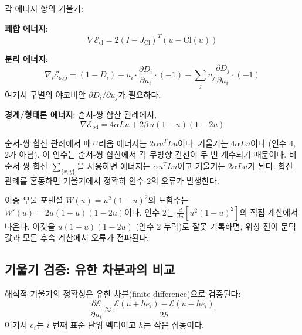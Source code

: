 각 에너지 항의 기울기:

\textbf{폐합 에너지}:
\begin{equation}
    \nabla \mathcal{E}_{\mathrm{cl}} = 2(I - J_{\mathrm{Cl}})^T (u - \mathrm{Cl}(u))
    \label{eq:grad-ecl}
\end{equation}

\textbf{분리 에너지}:
\begin{equation}
    \nabla_i \mathcal{E}_{\mathrm{sep}} = (1 - D_i) + u_i \cdot \frac{\partial D_i}{\partial u_i} \cdot (-1) + \sum_{j} u_j \frac{\partial D_j}{\partial u_i} \cdot (-1)
    \label{eq:grad-esep}
\end{equation}
여기서 구별의 야코비안 $\partial D_i / \partial u_j$가 필요하다.

\textbf{경계/형태론 에너지}: 순서-쌍 합산 관례에서,
\begin{equation}
    \nabla \mathcal{E}_{\mathrm{bd}} = 4\alpha L u + 2\beta\, u(1-u)(1-2u)
    \label{eq:grad-ebd}
\end{equation}

\begin{tcolorbox}[colback=red!5, colframe=red!50!black, title=주의: 경계 에너지 기울기의 인수 4]
순서-쌍 합산 관례에서 매끄러움 에너지는 $2\alpha u^T L u$이다. 기울기는 $4\alpha L u$이다 (인수 $4$, $2$가 아님). 이 인수는 순서-쌍 합산에서 각 무방향 간선이 두 번 계수되기 때문이다. 비순서-쌍 합산 $\sum_{\{x,y\}}$을 사용하면 에너지는 $\alpha u^T L u$이고 기울기는 $2\alpha L u$가 된다. 합산 관례를 혼동하면 기울기에서 정확히 인수 2의 오류가 발생한다.
\end{tcolorbox}

\begin{tcolorbox}[colback=red!5, colframe=red!50!black, title=주의: 이중-우물 기울기의 인수 2]
이중-우물 포텐셜 $W(u) = u^2(1-u)^2$의 도함수는 $W'(u) = 2u(1-u)(1-2u)$이다. 인수 $2$는 $\frac{d}{du}[u^2(1-u)^2]$의 직접 계산에서 나온다. 이것을 $u(1-u)(1-2u)$ (인수 $2$ 누락)로 잘못 기록하면, 위상 전이 문턱값과 모든 후속 계산에서 오류가 전파된다.
\end{tcolorbox}

\subsection{기울기 검증: 유한 차분과의 비교}

해석적 기울기의 정확성은 유한 차분(finite difference)으로 검증된다:
\begin{equation}
    \frac{\partial \mathcal{E}}{\partial u_i} \approx \frac{\mathcal{E}(u + h e_i) - \mathcal{E}(u - h e_i)}{2h}
\end{equation}
여기서 $e_i$는 $i$-번째 표준 단위 벡터이고 $h$는 작은 섭동이다.

